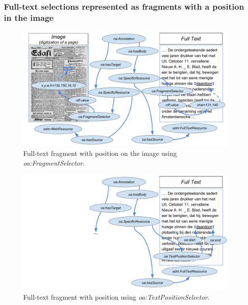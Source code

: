 \documentclass[a4paper,UKenglish,cleveref, autoref]{oasics-v2019}
\begin{document}
\subsubsection{Full-text selections represented as fragments with a position in the image}

\begin{figure}
    \centering
    \includegraphics{Fig4}
    \caption{Full-text fragment with position on the image using \emph{oa:FragmentSelector}.}
\end{figure}

\begin{figure}
    \centering
    \includegraphics{Fig5}
    \caption{Full-text fragment with position using \emph{oa:TextPositionSelector}.}
\end{figure}
\end{document}
